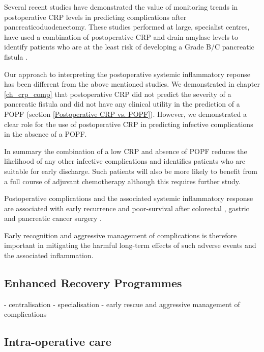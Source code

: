 Several recent studies have demonstrated the value of monitoring trends in postoperative CRP levels in predicting complications after pancreaticoduodenectomy.
These studies performed at large, specialist centres, have used a combination of postoperative CRP and drain amylase levels to identify patients who are at the least risk of developing a Grade B/C pancreatic fistula \parencite{hiyoshi_usefulness_2013, ansorge_diagnostic_2014, kosaka_multivariate_2014}.

Our approach to interpreting the postoperative systemic inflammatory reponse has been different from the above mentioned studies. 
We demonstrated in chapter \ref{ch_crp_comp} that postoperative CRP did not predict the severity of a pancreatic fistula and did not have any clinical utility in the prediction of a POPF (section \ref{Postoperative CRP vs. POPF}).
However, we demonstrated a clear role for the use of postoperative CRP in predicting infective complications in the absence of a POPF. 

In summary the combination of a low CRP and absence of POPF reduces the likelihood of any other infective complications and identifies patients who are suitable for early discharge.
Such patients will also be more likely to benefit from a full course of adjuvant chemotherapy although this requires further study.

Postoperative complications and the associated systemic inflammatory response are associated with early recurrence and poor-survival after colorectal \parencite{artinyan_infectious_2015, mcardle_impact_2005}, gastric \parencite{hayashi_impact_2015,kubota_prognostic_2014}  and pancreatic cancer surgery \parencite{aoyama_impact_2015, kamphues_postoperative_2012}.

Early recognition and aggressive management of complications is therefore important in mitigating the harmful long-term effects of such adverse events and the associated inflammation. 

\subsection{Enhanced Recovery Programmes}


- centralisation
- specialisation
- early rescue and aggressive management of complications \parencite{gouma_rates_2000}



\subsection{Intra-operative care}

